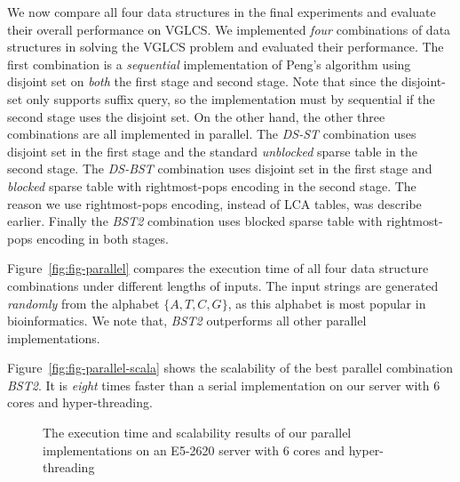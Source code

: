 We now compare all four data structures in the final experiments and
evaluate their overall performance on VGLCS.  We implemented {\em
  four} combinations of data structures in solving the VGLCS problem
and evaluated their performance.  The first combination is a {\em
  sequential} implementation of Peng's algorithm using disjoint set on
{\em both} the first stage and second stage.  Note that since the
disjoint-set only supports suffix query, so the implementation must by
sequential if the second stage uses the disjoint set.  On the other
hand, the other three combinations are all implemented in parallel.
The {\em DS-ST} combination uses disjoint set in the first stage and
the standard {\em unblocked} sparse table in the second stage.  The
{\em DS-BST} combination uses disjoint set in the first stage and {\em
  blocked} sparse table with rightmost-pops encoding in the second
stage.  The reason we use rightmost-pops encoding, instead of LCA
tables, was describe earlier.  Finally the {\em BST2} combination uses
blocked sparse table with rightmost-pops encoding in both stages.

Figure~\ref{fig:fig-parallel} compares the execution time of all four
data structure combinations under different lengths of inputs.  The
input strings are generated {\em randomly} from the alphabet $\{A, T,
C, G\}$, as this alphabet is most popular in bioinformatics.  We note
that, {\em BST2} outperforms all other parallel implementations. %

Figure~\ref{fig:fig-parallel-scala} shows the scalability of the best
parallel combination {\em BST2}.  It is {\em eight} times faster than
a serial implementation on our server with 6 cores and
hyper-threading.

\begin{figure}[!thb]
  \centering
  \caption{The execution time and scalability results of our parallel
    implementations on an E5-2620 server with 6 cores and
    hyper-threading}
\end{figure}
